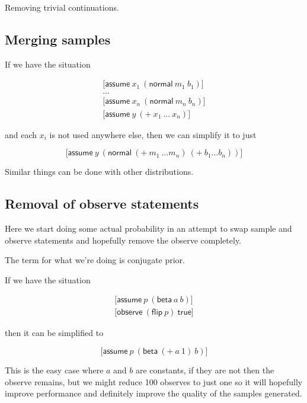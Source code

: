 \documentclass[a4paper]{article}
\begin{document}
Removing trivial continuations.



\subsection{Merging samples}

If we have the situation

\[
	\begin{array}{l}
		\lbrack \mathsf{assume}\ x_1\ (\mathsf{normal}\ m_1\ b_1) \rbrack \\
		\dots \\
		\lbrack \mathsf{assume}\ x_n\ (\mathsf{normal}\ m_n\ b_n) \rbrack \\
		\lbrack \mathsf{assume}\ y\ (+\ x_1\ ...\ x_n) \rbrack
	\end{array}
\]

and each \(x_i\) is not used anywhere else, then we can simplify it to just

\[\lbrack \mathsf{assume}\ y\ (\mathsf{normal}\ (+\ m_1\ \dots m_n)\ (+\ b_1 \dots b_n)) \rbrack\]

Similar things can be done with other distributions.



\subsection{Removal of observe statements}

Here we start doing some actual probability in an attempt to swap sample and observe statements and hopefully remove the observe completely.

The term for what we're doing is conjugate prior.

If we have the situation

\[
	\begin{array}{l}
		\lbrack \mathsf{assume}\ p\ (\mathsf{beta}\ a\ b) \rbrack \\
		\lbrack \mathsf{observe}\ (\mathsf{flip}\ p)\ \mathsf{true} \rbrack
	\end{array}
\]

then it can be simplified to

\[\lbrack \mathsf{assume}\ p\ (\mathsf{beta}\ (+\ a\ 1)\ b) \rbrack\]

This is the easy case where \(a\) and \(b\) are constants, if they are not then the observe remains, but we might reduce 100 observes to just one so it will hopefully improve performance and definitely improve the quality of the samples generated.
\end{document}
